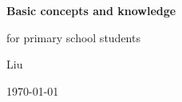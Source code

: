 \begin{titlepage}
    \begin{flushleft}
        \vspace*{3.5cm}


        \vspace{1.5cm}
        \textbf{\Huge{\color{myred}Basic concepts and knowledge}}

        \vspace{1cm}

        for primary school students

        \vfill
        \vspace{2cm}
    

    \end{flushleft}
    \begin{flushright}

        \Large Liu \par
   \today
    \end{flushright}
\end{titlepage}